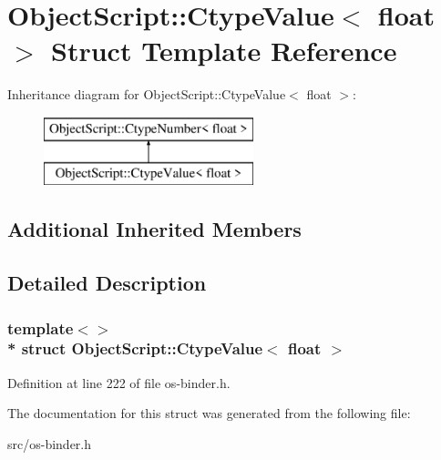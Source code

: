 \hypertarget{struct_object_script_1_1_ctype_value_3_01float_01_4}{}\section{Object\+Script\+:\+:Ctype\+Value$<$ float $>$ Struct Template Reference}
\label{struct_object_script_1_1_ctype_value_3_01float_01_4}
Inheritance diagram for Object\+Script\+:\+:Ctype\+Value$<$ float $>$\+:\begin{figure}[H]
\begin{center}
\leavevmode
\includegraphics[height=2.000000cm]{struct_object_script_1_1_ctype_value_3_01float_01_4}
\end{center}
\end{figure}
\subsection*{Additional Inherited Members}


\subsection{Detailed Description}
\subsubsection*{template$<$$>$\\*
struct Object\+Script\+::\+Ctype\+Value$<$ float $>$}



Definition at line 222 of file os-\/binder.\+h.



The documentation for this struct was generated from the following file\+:\begin{DoxyCompactItemize}
\item 
src/os-\/binder.\+h\end{DoxyCompactItemize}
